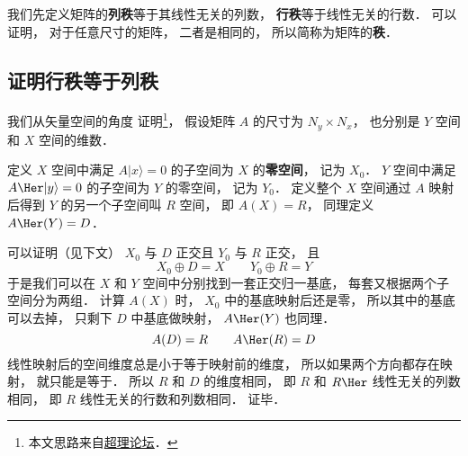 

我们先定义矩阵的\textbf{列秩}等于其线性无关的列数， \textbf{行秩}等于线性无关的行数． 可以证明， 对于任意尺寸的矩阵， 二者是相同的， 所以简称为矩阵的\textbf{秩}．

\subsection{证明行秩等于列秩}
我们从矢量空间的角度 证明\footnote{本文思路来自\href{https://chaoli.club/index.php/4821}{超理论坛}．}， 假设矩阵 $A$ 的尺寸为 $N_y \times N_x$， 也分别是 $Y$ 空间和 $X$ 空间的维数．

定义 $X$ 空间中满足 $A |x\rangle = 0$ 的子空间为 $X$ 的\textbf{零空间}， 记为 $X_0$． $Y$ 空间中满足 $A\Her |y\rangle = 0$ 的子空间为 $Y$ 的零空间， 记为 $Y_0$． 定义整个 $X$ 空间通过 $A$ 映射后得到 $Y$ 的另一个子空间叫 $R$ 空间， 即 $A(X) = R$， 同理定义 $A\Her(Y) = D$． %

可以证明（见下文） $X_0$ 与 $D$ 正交且 $Y_0$ 与 $R$ 正交， 且
\begin{equation}\label{MatRnk_eq1}
X_0 \oplus D = X
\qquad
Y_0 \oplus R = Y
\end{equation}
于是我们可以在 $X$ 和 $Y$ 空间中分别找到一套正交归一基底， 每套又根据两个子空间分为两组． 计算 $A(X)$ 时， $X_0$ 中的基底映射后还是零， 所以其中的基底可以去掉， 只剩下 $D$ 中基底做映射， $A\Her(Y)$ 也同理．
\begin{equation}
A(D) = R
\qquad
A\Her(R) = D
\end{equation}
线性映射后的空间维度总是小于等于映射前的维度， 所以如果两个方向都存在映射， 就只能是等于． 所以 $R$ 和 $D$ 的维度相同， 即 $R$ 和 $R\Her$ 线性无关的列数相同， 即 $R$ 线性无关的行数和列数相同． 证毕．

